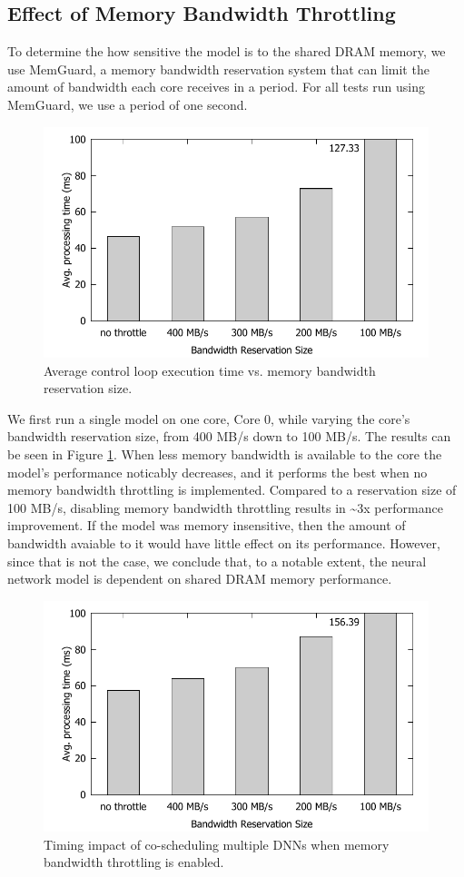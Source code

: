 \subsection{Effect of Memory Bandwidth Throttling}

To determine the how sensitive the model is to the shared DRAM 
memory, we use MemGuard, a memory bandwidth reservation system that 
can limit the amount of bandwidth each core receives in a period. For 
all tests run using MemGuard, we use a period of one second. 

\begin{figure}[h]
  \centering
  \includegraphics[width=.45\textwidth]{figs/memguard_multicore}
  \caption{Average control loop execution time vs.
    memory bandwidth reservation size. }
  \label{fig:memguard_multicore}
\end{figure}

We first run a single model on one core, Core 0, while varying the 
core's bandwidth reservation size, from 400 MB/s down to 100 MB/s. 
The results can be seen in Figure \ref{fig:memguard_multicore}. When less 
memory bandwidth is available to the core the model's performance 
noticably decreases, and it performs the best when no memory bandwidth 
throttling is implemented. Compared to a reservation size of 100 
MB/s, disabling memory bandwidth throttling results in 
\textasciitilde3x performance improvement. If the model was memory 
insensitive, then the amount of bandwidth avaiable to it would have 
little effect on its performance. However, since that is not the 
case, we conclude that, to a notable extent, the neural network model 
is dependent on shared DRAM memory performance.

\begin{figure}[h]
  \centering
  \includegraphics[width=.45\textwidth]{figs/memguard_multimodel}
  \caption{Timing impact of co-scheduling multiple DNNs when memory
bandwidth throttling is enabled. }
  \label{fig:memguard_multimodel}
\end{figure}

